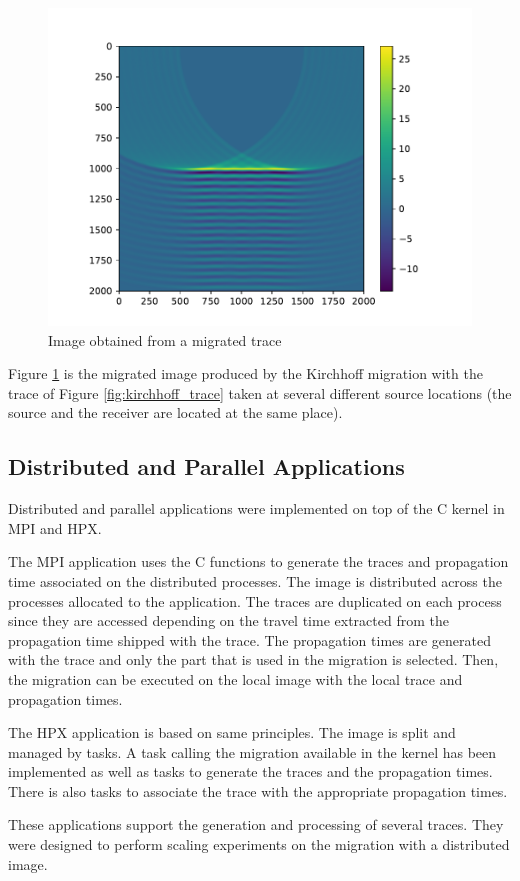 \begin{figure}[H]
	\centering
	\includegraphics[width=.7\textwidth]{img.pdf}
	\caption{Image obtained from a migrated trace\label{fig:kirchhoff_image}}
\end{figure}
Figure \ref{fig:kirchhoff_image} is the migrated image produced by the Kirchhoff migration with the trace of Figure \ref{fig:kirchhoff_trace} taken at several different source locations (the source and the receiver are located at the same place).

\subsection{Distributed and Parallel Applications}
Distributed and parallel applications were implemented on top of the C kernel in MPI and HPX.

The MPI application uses the C functions to generate the traces and propagation time associated on the distributed processes.
The image is distributed across the processes allocated to the application.
The traces are duplicated on each process since they are accessed depending on the travel time extracted from the propagation time shipped with the trace.
The propagation times are generated with the trace and only the part that is used in the migration is selected.
Then, the migration can be executed on the local image with the local trace and propagation times.

The HPX application is based on same principles.
The image is split and managed by tasks.
A task calling the migration available in the kernel has been implemented as well as tasks to generate the traces and the propagation times.
There is also tasks to associate the trace with the appropriate propagation times.

These applications support the generation and processing of several traces.
They were designed to perform scaling experiments on the migration with a distributed image.

